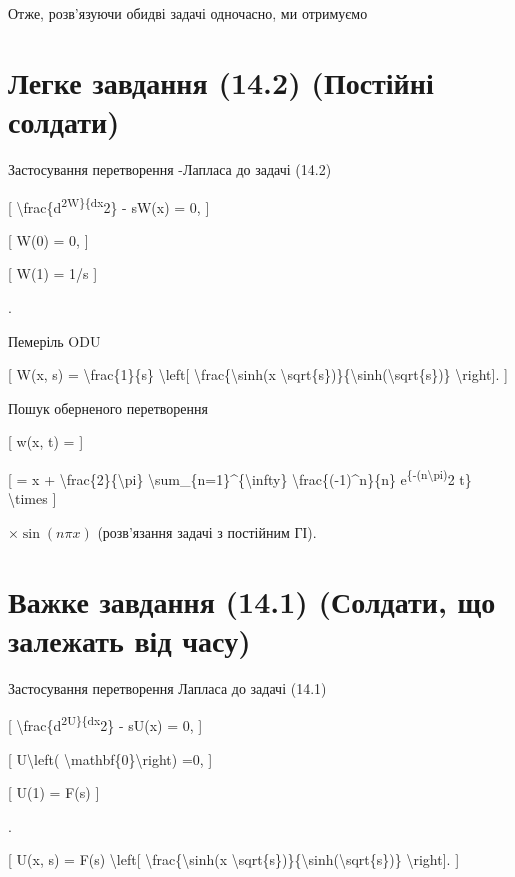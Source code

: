 \documentclass[
]{article}
\begin{document}
Отже, розв'язуючи обидві задачі одночасно, ми отримуємо

\section{Легке завдання (14.2) (Постійні
солдати)}\label{ux43bux435ux433ux43aux435-ux437ux430ux432ux434ux430ux43dux43dux44f-14.2-ux43fux43eux441ux442ux456ux439ux43dux456-ux441ux43eux43bux434ux430ux442ux438}

Застосування перетворення -Лапласа до задачі (14.2)

{[} \textbackslash frac\{d\textsuperscript{2W\}\{dx}2\} - sW(x) = 0, {]}

{[} W(0) = 0, {]}

{[} W(1) = 1/s {]}

.

Пемеріль ODU

{[} W(x, s) = \textbackslash frac\{1\}\{s\} \textbackslash left{[}
\textbackslash frac\{\textbackslash sinh(x
\textbackslash sqrt\{s\})\}\{\textbackslash sinh(\textbackslash sqrt\{s\})\}
\textbackslash right{]}. {]}

Пошук оберненого перетворення

{[} w(x, t) = {]}

{[} = x + \textbackslash frac\{2\}\{\textbackslash pi\}
\textbackslash sum\_\{n=1\}\^{}\{\textbackslash infty\}
\textbackslash frac\{(-1)\^{}n\}\{n\}
e\textsuperscript{\{-(n\textbackslash pi)}2 t\} \textbackslash times {]}

\(\times \sin(n\pi x)\) (розв'язання задачі з постійним ГІ).

\section{Важке завдання (14.1) (Солдати, що залежать від
часу)}\label{ux432ux430ux436ux43aux435-ux437ux430ux432ux434ux430ux43dux43dux44f-14.1-ux441ux43eux43bux434ux430ux442ux438-ux449ux43e-ux437ux430ux43bux435ux436ux430ux442ux44c-ux432ux456ux434-ux447ux430ux441ux443}

Застосування перетворення Лапласа до задачі (14.1)

{[} \textbackslash frac\{d\textsuperscript{2U\}\{dx}2\} - sU(x) = 0, {]}

{[} U\textbackslash left(
\textbackslash mathbf\{0\}\textbackslash right) =0, {]}

{[} U(1) = F(s) {]}

.

{[} U(x, s) = F(s) \textbackslash left{[}
\textbackslash frac\{\textbackslash sinh(x
\textbackslash sqrt\{s\})\}\{\textbackslash sinh(\textbackslash sqrt\{s\})\}
\textbackslash right{]}. {]}
\end{document}
